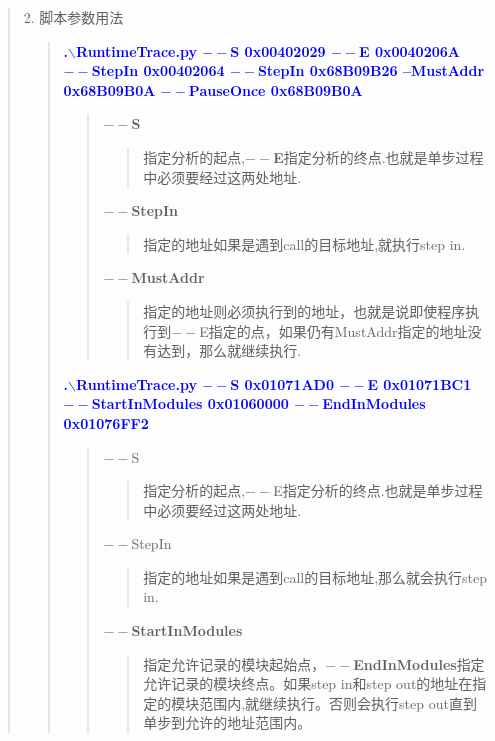 \documentclass[AutoFakeBold,AutoFakeSlant]{article}
\begin{document}
\begin{flushleft}
\begin{quote}
			\large 
			2. 脚本参数用法 \\
			\begin{quote}
				\textcolor{blue}{ \textbf{ \Large
				.$\backslash$RuntimeTrace.py $--$S 0x00402029 $--$E 0x0040206A $--$StepIn 0x00402064 $--$StepIn 0x68B09B26 --MustAddr 0x68B09B0A $--$PauseOnce 0x68B09B0A }}\\
				\begin{quote}
					\textbf{$--$S}
					\begin{quote} 指定分析的起点,\textbf{$--$E}指定分析的终点.也就是单步过程中必须要经过这两处地址.
					\end{quote}
					\textbf{$--$StepIn} 
					\begin{quote}
						指定的地址如果是遇到call的目标地址,就执行step in.
					\end{quote}
					\textbf{$--$MustAddr}
					\begin{quote}
					 指定的地址则必须执行到的地址，也就是说即使程序执行到$--$E指定的点，如果仍有MustAddr指定的地址没有达到，那么就继续执行.
					\end{quote}
				\end{quote}
			
			\bigskip
			\bigskip
			
			\textcolor{blue}{ \textbf{ \Large
		    .$\backslash$RuntimeTrace.py $--$S 0x01071AD0 $--$E 0x01071BC1 $--$StartInModules 0x01060000 $--$EndInModules 0x01076FF2 }} \\
		    \begin{quote}
			    $--$S \begin{quote}指定分析的起点,$--$E指定分析的终点.也就是单步过程中必须要经过这两处地址.\end{quote}
			    $--$StepIn \begin{quote}指定的地址如果是遇到call的目标地址,那么就会执行step in.\end{quote}
			    \textbf{$--$StartInModules} \begin{quote}指定允许记录的模块起始点，\textbf{$--$EndInModules}指定允许记录的模块终点。如果step in和step out的地址在指定的模块范围内,就继续执行。否则会执行step out直到单步到允许的地址范围内。\end{quote}
			\end{quote}
		    
			\clearpage
		    

\end{quote}
\end{quote}
\end{flushleft}
\end{document}
